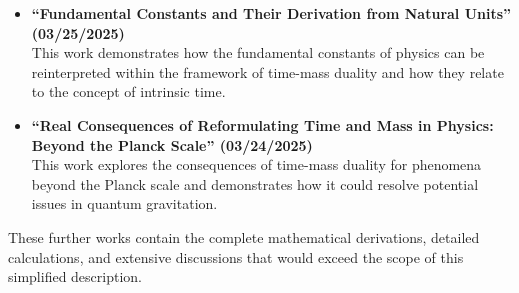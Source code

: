 \documentclass{article}
\begin{document}
\begin{itemize}
	\item \textbf{``Fundamental Constants and Their Derivation from Natural Units'' (03/25/2025)} \\
	This work demonstrates how the fundamental constants of physics can be reinterpreted within the framework of time-mass duality and how they relate to the concept of intrinsic time.
	
	\item \textbf{``Real Consequences of Reformulating Time and Mass in Physics: Beyond the Planck Scale'' (03/24/2025)} \\
	This work explores the consequences of time-mass duality for phenomena beyond the Planck scale and demonstrates how it could resolve potential issues in quantum gravitation.
\end{itemize}

These further works contain the complete mathematical derivations, detailed calculations, and extensive discussions that would exceed the scope of this simplified description.
\end{document}
